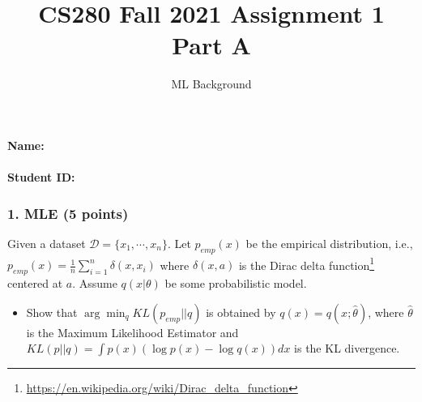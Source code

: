 \documentclass[12pt]{article}%
\begin{document}
\title{CS280 Fall 2021 Assignment 1 \\ Part A}
\author{ML Background}
\maketitle

\paragraph{Name:}

\paragraph{Student ID:}

\newpage


\subsubsection*{1. MLE (5 points)}
Given a dataset $\mathcal{D} = \{x_1,\cdots, x_n\}$. Let $p_{emp}(x)$ be the empirical distribution, i.e., $p_{emp}(x)=\frac{1}{n}\sum_{i=1}^n\delta(x,x_i) $ where $\delta(x,a)$ is the Dirac delta function\footnote{\url{https://en.wikipedia.org/wiki/Dirac_delta_function}} centered at $a$. Assume $q(x|\theta)$ be some probabilistic model.   
\begin{itemize}
	\item Show that $\arg\min_q KL(p_{emp}||q)$ is obtained by $q(x)=q(x;\hat{\theta})$, where $\hat{\theta}$ is the Maximum Likelihood Estimator and $KL(p||q)=\int p(x)(\log p(x)- \log q(x))dx$ is the KL divergence.
\end{itemize}





\newpage




\end{document}
